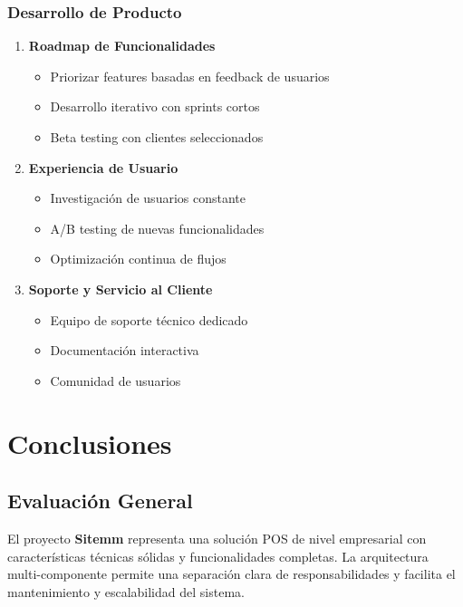\documentclass[12pt,a4paper]{article}
\begin{document}
\subsubsection{Desarrollo de Producto}
\begin{enumerate}
    \item \textbf{Roadmap de Funcionalidades}
    \begin{itemize}
        \item Priorizar features basadas en feedback de usuarios
        \item Desarrollo iterativo con sprints cortos
        \item Beta testing con clientes seleccionados
    \end{itemize}
    
    \item \textbf{Experiencia de Usuario}
    \begin{itemize}
        \item Investigación de usuarios constante
        \item A/B testing de nuevas funcionalidades
        \item Optimización continua de flujos
    \end{itemize}
    
    \item \textbf{Soporte y Servicio al Cliente}
    \begin{itemize}
        \item Equipo de soporte técnico dedicado
        \item Documentación interactiva
        \item Comunidad de usuarios
    \end{itemize}
\end{enumerate}

\section{Conclusiones}

\subsection{Evaluación General}

El proyecto \textbf{Sitemm} representa una solución POS de nivel empresarial con características técnicas sólidas y funcionalidades completas. La arquitectura multi-componente permite una separación clara de responsabilidades y facilita el mantenimiento y escalabilidad del sistema.
\end{document}
